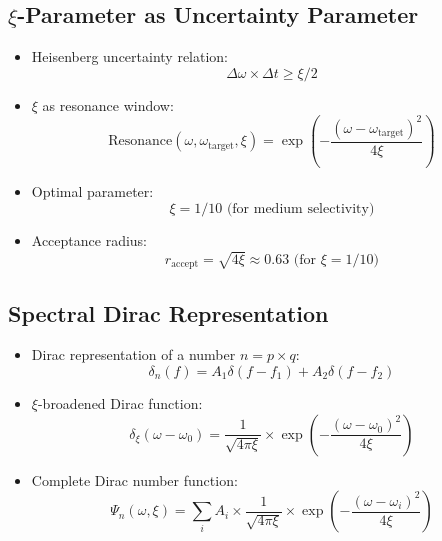 \documentclass[12pt,a4paper]{article}
\begin{document}
	\subsection{$\xi$-Parameter as Uncertainty Parameter}
	\begin{itemize}
		\item Heisenberg uncertainty relation:
		\begin{equation}
			\Delta\omega \times \Delta t \geq \xi/2
		\end{equation}
		
		\item $\xi$ as resonance window:
		\begin{equation}
			\text{Resonance}(\omega, \omega_{\text{target}}, \xi) = \exp\left(-\frac{(\omega-\omega_{\text{target}})^2}{4\xi}\right)
		\end{equation}
		
		\item Optimal parameter:
		\begin{equation}
			\xi = 1/10 \text{ (for medium selectivity)}
		\end{equation}
		
		\item Acceptance radius:
		\begin{equation}
			r_{\text{accept}} = \sqrt{4\xi} \approx 0.63 \text{ (for } \xi = 1/10)
		\end{equation}
	\end{itemize}
	
	\subsection{Spectral Dirac Representation}
	\begin{itemize}
		\item Dirac representation of a number $n = p \times q$:
		\begin{equation}
			\delta_n(f) = A_1\delta(f - f_1) + A_2\delta(f - f_2)
		\end{equation}
		
		\item $\xi$-broadened Dirac function:
		\begin{equation}
			\delta_\xi(\omega - \omega_0) = \frac{1}{\sqrt{4\pi\xi}} \times \exp\left(-\frac{(\omega-\omega_0)^2}{4\xi}\right)
		\end{equation}
		
		\item Complete Dirac number function:
		\begin{equation}
			\Psi_n(\omega,\xi) = \sum_i A_i \times \frac{1}{\sqrt{4\pi\xi}} \times \exp\left(-\frac{(\omega-\omega_i)^2}{4\xi}\right)
		\end{equation}
	\end{itemize}
	
\end{document}
